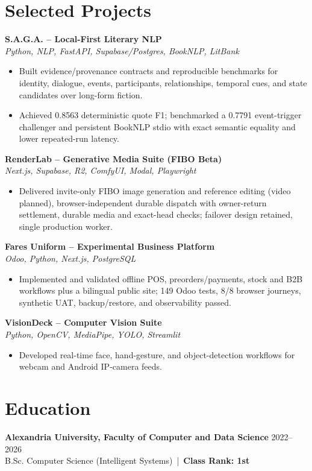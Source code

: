 \documentclass[letterpaper]{article}
\newcommand{\projectheader}[2]{\textbf{#1} \\\textit{#2} \\}
\begin{document}
\section*{Selected Projects}
\projectheader{S.A.G.A. -- Local-First Literary NLP}{Python, NLP, FastAPI, Supabase/Postgres, BookNLP, LitBank}
\begin{itemize}
\item Built evidence/provenance contracts and reproducible benchmarks for identity, dialogue, events, participants, relationships, temporal cues, and state candidates over long-form fiction.
\item Achieved 0.8563 deterministic quote F1; benchmarked a 0.7791 event-trigger challenger and persistent BookNLP stdio with exact semantic equality and lower repeated-run latency.
\end{itemize}
\projectheader{RenderLab -- Generative Media Suite (FIBO Beta)}{Next.js, Supabase, R2, ComfyUI, Modal, Playwright}
\begin{itemize}
\item Delivered invite-only FIBO image generation and reference editing (video planned), browser-independent durable dispatch with owner-return settlement, durable media and exact-head checks; failover design retained, single production worker.
\end{itemize}
\projectheader{Fares Uniform -- Experimental Business Platform}{Odoo, Python, Next.js, PostgreSQL}
\begin{itemize}
\item Implemented and validated offline POS, preorders/payments, stock and B2B workflows plus a bilingual public site; 149 Odoo tests, 8/8 browser journeys, synthetic UAT, backup/restore, and observability passed.
\end{itemize}
\projectheader{VisionDeck -- Computer Vision Suite}{Python, OpenCV, MediaPipe, YOLO, Streamlit}
\begin{itemize}
\item Developed real-time face, hand-gesture, and object-detection workflows for webcam and Android IP-camera feeds.
\end{itemize}

\section*{Education}
\textbf{Alexandria University, Faculty of Computer and Data Science} \hfill 2022--2026\\
B.Sc. Computer Science (Intelligent Systems) \,|\, \textbf{Class Rank: 1st}
\end{document}
